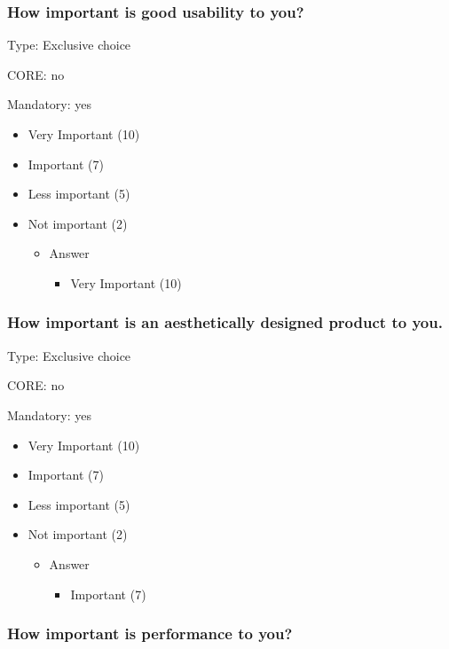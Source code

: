 \subsubsection{How important is good usability to you?}
\label{sec:org78edac0}
Type: Exclusive choice 

CORE: no

Mandatory: yes 

\begin{itemize}
	\item Very Important (10)
	\item Important (7)
	\item Less important (5)
	\item Not important (2)
	
	\begin{itemize}
		\item Answer
		\begin{itemize}
			\item Very Important (10)
		\end{itemize}
	\end{itemize}
\end{itemize}

\subsubsection{How important is an aesthetically designed product to you.}
\label{sec:org1dadec1}
Type: Exclusive choice 

CORE: no

Mandatory: yes 

\begin{itemize}
	\item Very Important (10)
	\item Important (7)
	\item Less important (5)
	\item Not important (2)
	
	\begin{itemize}
		\item Answer
		\begin{itemize}
			\item Important (7)
		\end{itemize}
	\end{itemize}
\end{itemize}
\subsubsection{How important is performance to you?}
\label{sec:orgf91a813}

